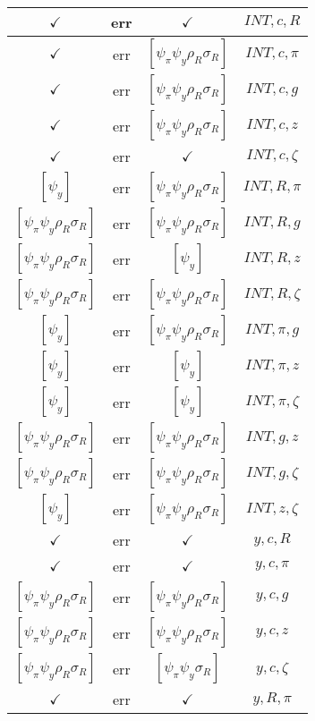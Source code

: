 \documentclass[a4paper,10pt]{article}
\begin{document}
\begin{longtable}{|c|c|c|c|}
\hline
$\checkmark$ & err & $\checkmark$ & ${INT},{c},{R}$ \\
\hline
$\checkmark$ & err & $[\psi_\pi \psi_y \rho_R \sigma_R ]$ & ${INT},{c},{\pi}$ \\
\hline
$\checkmark$ & err & $[\psi_\pi \psi_y \rho_R \sigma_R ]$ & ${INT},{c},{g}$ \\
\hline
$\checkmark$ & err & $[\psi_\pi \psi_y \rho_R \sigma_R ]$ & ${INT},{c},{z}$ \\
\hline
$\checkmark$ & err & $\checkmark$ & ${INT},{c},{\zeta}$ \\
\hline
$[\psi_y ]$ & err & $[\psi_\pi \psi_y \rho_R \sigma_R ]$ & ${INT},{R},{\pi}$ \\
\hline
$[\psi_\pi \psi_y \rho_R \sigma_R ]$ & err & $[\psi_\pi \psi_y \rho_R \sigma_R ]$ & ${INT},{R},{g}$ \\
\hline
$[\psi_\pi \psi_y \rho_R \sigma_R ]$ & err & $[\psi_y ]$ & ${INT},{R},{z}$ \\
\hline
$[\psi_\pi \psi_y \rho_R \sigma_R ]$ & err & $[\psi_\pi \psi_y \rho_R \sigma_R ]$ & ${INT},{R},{\zeta}$ \\
\hline
$[\psi_y ]$ & err & $[\psi_\pi \psi_y \rho_R \sigma_R ]$ & ${INT},{\pi},{g}$ \\
\hline
$[\psi_y ]$ & err & $[\psi_y ]$ & ${INT},{\pi},{z}$ \\
\hline
$[\psi_y ]$ & err & $[\psi_y ]$ & ${INT},{\pi},{\zeta}$ \\
\hline
$[\psi_\pi \psi_y \rho_R \sigma_R ]$ & err & $[\psi_\pi \psi_y \rho_R \sigma_R ]$ & ${INT},{g},{z}$ \\
\hline
$[\psi_\pi \psi_y \rho_R \sigma_R ]$ & err & $[\psi_\pi \psi_y \rho_R \sigma_R ]$ & ${INT},{g},{\zeta}$ \\
\hline
$[\psi_y ]$ & err & $[\psi_\pi \psi_y \rho_R \sigma_R ]$ & ${INT},{z},{\zeta}$ \\
\hline
$\checkmark$ & err & $\checkmark$ & ${y},{c},{R}$ \\
\hline
$\checkmark$ & err & $\checkmark$ & ${y},{c},{\pi}$ \\
\hline
$[\psi_\pi \psi_y \rho_R \sigma_R ]$ & err & $[\psi_\pi \psi_y \rho_R \sigma_R ]$ & ${y},{c},{g}$ \\
\hline
$[\psi_\pi \psi_y \rho_R \sigma_R ]$ & err & $[\psi_\pi \psi_y \rho_R \sigma_R ]$ & ${y},{c},{z}$ \\
\hline
$[\psi_\pi \psi_y \rho_R \sigma_R ]$ & err & $[\psi_\pi \psi_y \sigma_R ]$ & ${y},{c},{\zeta}$ \\
\hline
$\checkmark$ & err & $\checkmark$ & ${y},{R},{\pi}$ \\

\end{longtable}
\end{document}
